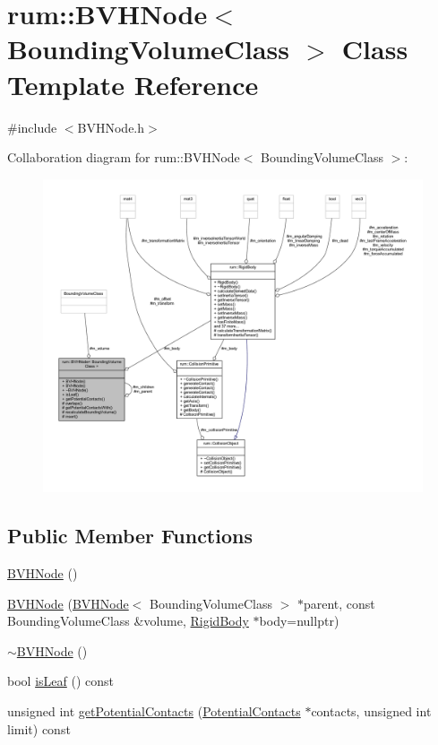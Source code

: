 \hypertarget{classrum_1_1_b_v_h_node}{}\section{rum\+:\+:B\+V\+H\+Node$<$ Bounding\+Volume\+Class $>$ Class Template Reference}
\label{classrum_1_1_b_v_h_node}


{\ttfamily \#include $<$B\+V\+H\+Node.\+h$>$}



Collaboration diagram for rum\+:\+:B\+V\+H\+Node$<$ Bounding\+Volume\+Class $>$\+:\nopagebreak
\begin{figure}[H]
\begin{center}
\leavevmode
\includegraphics[width=350pt]{classrum_1_1_b_v_h_node__coll__graph}
\end{center}
\end{figure}
\subsection*{Public Member Functions}
\begin{DoxyCompactItemize}
\item 
\mbox{\hyperlink{classrum_1_1_b_v_h_node_aca2a55118d5c021f92b8e0105fa32625}{B\+V\+H\+Node}} ()
\item 
\mbox{\hyperlink{classrum_1_1_b_v_h_node_a4d6bef35007d6473eefe2ce8979e2e2c}{B\+V\+H\+Node}} (\mbox{\hyperlink{classrum_1_1_b_v_h_node}{B\+V\+H\+Node}}$<$ Bounding\+Volume\+Class $>$ $\ast$parent, const Bounding\+Volume\+Class \&volume, \mbox{\hyperlink{classrum_1_1_rigid_body}{Rigid\+Body}} $\ast$body=nullptr)
\item 
\mbox{\hyperlink{classrum_1_1_b_v_h_node_a97283b0dd8f0cf52762da014a94ade0b}{$\sim$\+B\+V\+H\+Node}} ()
\item 
bool \mbox{\hyperlink{classrum_1_1_b_v_h_node_acabad7db26492af7a8e9fec6441466d4}{is\+Leaf}} () const
\item 
unsigned int \mbox{\hyperlink{classrum_1_1_b_v_h_node_aee31330a43145dd2ee59a245cf4481f1}{get\+Potential\+Contacts}} (\mbox{\hyperlink{structrum_1_1_potential_contacts}{Potential\+Contacts}} $\ast$contacts, unsigned int limit) const
\end{DoxyCompactItemize}
